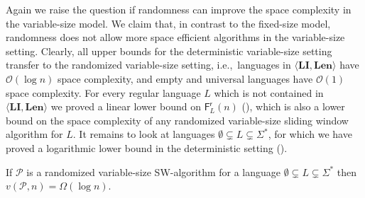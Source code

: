 \documentclass{article}\usepackage[a4paper,margin=20mm]{geometry}
\renewcommand{\O}{\mathcal{O}}
\renewcommand{\P}{\mathcal{P}}
\newcommand{\F}{\mathsf{F}}
\renewcommand{\r}{\mathsf{r}}
\newcommand{\Len}{\mathbf{Len}}
\newcommand{\LI}{\mathbf{LI}}
\begin{document}
Again we raise the question if randomness can improve the space complexity in the variable-size model.
We claim that, in contrast to the fixed-size model, randomness does not allow more space efficient
algorithms in the variable-size setting. 
Clearly, all upper bounds for the deterministic variable-size setting transfer to the randomized
variable-size setting,
i.e.,~languages in $\langle \LI, \Len \rangle$ have $\O(\log n)$ space complexity,
and empty and universal languages have $\O(1)$ space complexity.
For every regular language $L$ which is not contained in $\langle \LI, \Len \rangle$
we proved a linear lower bound on $\F^\r_L(n)$ (),
which is also a lower bound on the space complexity of any randomized variable-size sliding window algorithm for $L$.
It remains to look at languages $\emptyset \subsetneq L \subsetneq \Sigma^*$,
for which we have proved a logarithmic lower bound
in the deterministic setting ().

\begin{lemma}
	\label{lem:rand-length-lb}
	If $\P$ is a randomized variable-size SW-algorithm 
	for a language $\emptyset \subsetneq L \subsetneq \Sigma^*$
	then $v(\P,n) = \Omega(\log n)$.
\end{lemma}
\end{document}
